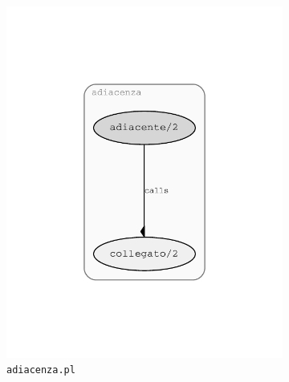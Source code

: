 \begin{figure}
	\centering
	\begin{subfigure}[b]{.4\textwidth}
		\includegraphics[width=\textwidth]{diagrams/adiacenza}
		\caption{\texttt{adiacenza.pl}}
	\end{subfigure}
	\begin{subfigure}[b]{.4\textwidth}

\end{subfigure}
\end{figure}
